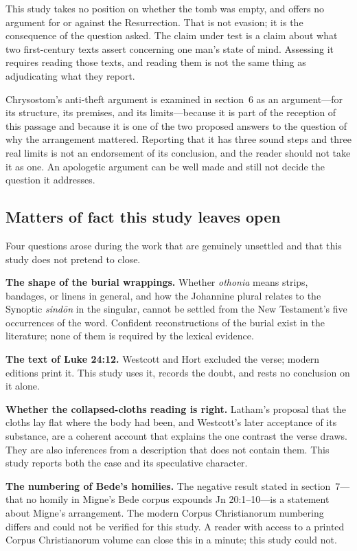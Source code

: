 This study takes no position on whether the tomb was empty, and offers no
argument for or against the Resurrection. That is not evasion; it is the
consequence of the question asked. The claim under test is a claim about what
two first-century texts assert concerning one man's state of mind. Assessing it
requires reading those texts, and reading them is not the same thing as
adjudicating what they report.

Chrysostom's anti-theft argument is examined in section~6 as an argument---for
its structure, its premises, and its limits---because it is part of the
reception of this passage and because it is one of the two proposed answers to
the question of why the arrangement mattered. Reporting that it has three sound
steps and three real limits is not an endorsement of its conclusion, and the
reader should not take it as one. An apologetic argument can be well made and
still not decide the question it addresses.

\subsection{Matters of fact this study leaves open}

Four questions arose during the work that are genuinely unsettled and that this
study does not pretend to close.

\textbf{The shape of the burial wrappings.} Whether \emph{othonia} means strips,
bandages, or linens in general, and how the Johannine plural relates to the
Synoptic \emph{sind\=on} in the singular, cannot be settled from the New
Testament's five occurrences of the word. Confident reconstructions of the
burial exist in the literature; none of them is required by the lexical
evidence.

\textbf{The text of Luke 24:12.} Westcott and Hort excluded the verse; modern
editions print it. This study uses it, records the doubt, and rests no
conclusion on it alone.

\textbf{Whether the collapsed-cloths reading is right.} Latham's proposal that
the cloths lay flat where the body had been, and Westcott's later acceptance of
its substance, are a coherent account that explains the one contrast the verse
draws. They are also inferences from a description that does not contain them.
This study reports both the case and its speculative character.

\textbf{The numbering of Bede's homilies.} The negative result stated in
section~7---that no homily in Migne's Bede corpus expounds Jn 20:1--10---is a
statement about Migne's arrangement. The modern Corpus Christianorum numbering
differs and could not be verified for this study. A reader with access to a
printed Corpus Christianorum volume can close this in a minute; this study
could not.
